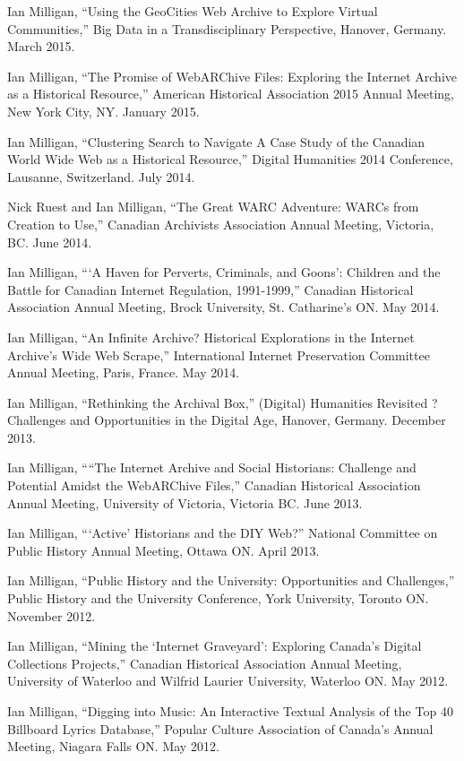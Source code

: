 \documentclass[11pt,article,oneside]{memoir}
\begin{document}
\ind Ian Milligan, ``Using the GeoCities Web Archive to Explore Virtual Communities,'' Big Data in a Transdisciplinary Perspective, Hanover, Germany. March 2015. 

\ind Ian Milligan, ``The Promise of WebARChive Files: Exploring the Internet Archive as a Historical Resource,'' American Historical Association 2015 Annual Meeting, New York City, NY. January 2015.

\ind Ian Milligan, ``Clustering Search to Navigate A Case Study of the Canadian World Wide Web as a Historical Resource,'' Digital Humanities 2014 Conference, Lausanne, Switzerland. July 2014.

\ind Nick Ruest and Ian Milligan, ``The Great WARC Adventure: WARCs from Creation to Use,'' Canadian Archivists Association Annual Meeting, Victoria, BC. June 2014.

\ind Ian Milligan, ```A Haven for Perverts, Criminals, and Goons': Children and the Battle for Canadian Internet Regulation, 1991-1999,'' Canadian Historical Association Annual Meeting, Brock University, St. Catharine's ON. May 2014.

\ind Ian Milligan, ``An Infinite Archive? Historical Explorations in the Internet Archive's Wide Web Scrape,'' International Internet Preservation Committee Annual Meeting, Paris, France. May 2014. 

\ind Ian Milligan, ``Rethinking the Archival Box,'' (Digital) Humanities Revisited ? Challenges and Opportunities in the Digital Age, Hanover, Germany. December 2013.

\ind Ian Milligan, ````The Internet Archive and Social Historians: Challenge and Potential Amidst the WebARChive Files,'' Canadian Historical Association Annual Meeting, University of Victoria, Victoria BC. June 2013. 

\ind Ian Milligan, ```Active' Historians and the DIY Web?'' National Committee on Public History Annual Meeting, Ottawa ON. April 2013.

\ind Ian Milligan, ``Public History and the University: Opportunities and Challenges,'' Public History and the University Conference, York University, Toronto ON. November 2012. 

\ind Ian Milligan, ``Mining the `Internet Graveyard': Exploring Canada's Digital Collections Projects,'' Canadian Historical Association Annual Meeting, University of Waterloo and Wilfrid Laurier University, Waterloo ON. May 2012. 

\ind Ian Milligan, ``Digging into Music: An Interactive Textual Analysis of the Top 40 Billboard Lyrics Database,'' Popular Culture Association of Canada's Annual Meeting, Niagara Falls ON. May 2012. 
\end{document}
